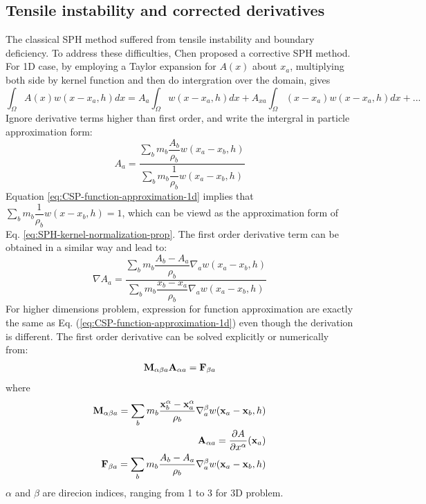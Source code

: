 \documentclass[journal abbreviation, manuscript]{copernicus}
\begin{document}
\subsection{Tensile instability and corrected derivatives}
The classical SPH method suffered from tensile instability and boundary deficiency. To address these difficulties, Chen \citep{chen1999improvement} proposed a corrective SPH method. For 1D case, by employing a Taylor expansion for $A(x)$ about $x_a$, multiplying both side by kernel function and then do intergration over the domain, gives
\begin{equation}
\int_{\Omega} A(x) w(x- x_a, h) dx = 
A_a \int_{\Omega} w(x - x_a, h) dx +A_{xa} \int_{\Omega} (x-x_a) w(x - x_a, h) dx +...
\end{equation}
Ignore derivative terms higher than first order, and write the intergral in particle approximation form:
\begin{equation}
A_a = \frac{\sum_b m_b \dfrac{A_b}{\rho_b} w(x_a-x_b, h)}{\sum_b m_b \dfrac{1}{\rho_b} w(x_a-x_b, h)}
\label{eq:CSP-function-approximation-1d}
\end{equation}
Equation \ref{eq:CSP-function-approximation-1d} implies that $\sum_b m_b \dfrac{1}{\rho_b} w(x-x_b, h) = 1$, which can be viewd as the approximation form of Eq. \ref{eq:SPH-kernel-normalization-prop}. The first order derivative term can be obtained in a similar way and lead to:
\begin{equation}
\nabla A_a = \frac{\sum_b m_b \dfrac{A_b - A_a}{\rho_b} \nabla_a w(x_a-x_b, h)}{\sum_b m_b \dfrac{x_b - x_a}{\rho_b} \nabla_a w(x_a-x_b, h)}
\end{equation}
For higher dimensions problem, expression for function approximation are exactly the same as Eq. (\ref{eq:CSP-function-approximation-1d}) even though the derivation is different. The first order derivative can be solved explicitly or numerically from:
\begin{equation}
\text{\textbf{M}}_{\alpha \beta a} \textbf{A}_{\alpha a} = \textbf{F}_{\beta a}
\end{equation}
where
\begin{align}
\text{\textbf{M}}_{\alpha \beta a} = \sum_b m_b \dfrac{\textbf{x}_b^{\alpha} - \textbf{x}_a^{\alpha}}{\rho_b} \nabla_a^{\beta} w(\textbf{x}_a -\textbf{x}_b, h) \\
\textbf{A}_{\alpha a} = \dfrac{\partial A}{\partial x^{\alpha}} (\textbf{x}_a)\\
\textbf{F}_{\beta a} = \sum_b m_b \dfrac{A_b - A_a}{\rho_b} \nabla_a^{\beta} w(\textbf{x}_a -\textbf{x}_b, h)
\end{align}
$\alpha$ and $\beta$ are direcion indices, ranging from 1 to 3 for 3D problem. 
\end{document}
